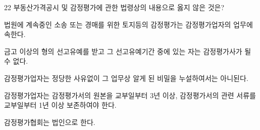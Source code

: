 \begin{question}{22}
부동산가격공시 및 감정평가에 관한 법령상의 내용으로 옳지 않은 것은?
\begin{choices}
  \item 법원에 계속중인 소송 또는 경매를 위한 토지등의 감정평가는 감정평가업자의 업무에 속한다.
  \item 금고 이상의 형의 선고유예를 받고 그 선고유예기간 중에 있는 자는 감정평가사가 될 수 없다.
  \item 감정평가업자는 정당한 사유없이 그 업무상 알게 된 비밀을 누설하여서는 아니된다.
  \item 감정평가업자는 감정평가서의 원본을 교부일부터 3년 이상, 감정평가서의 관련 서류를 교부일부터 1년 이상 보존하여야 한다.
  \item 감정평가협회는 법인으로 한다.
\end{choices}
\end{question}

